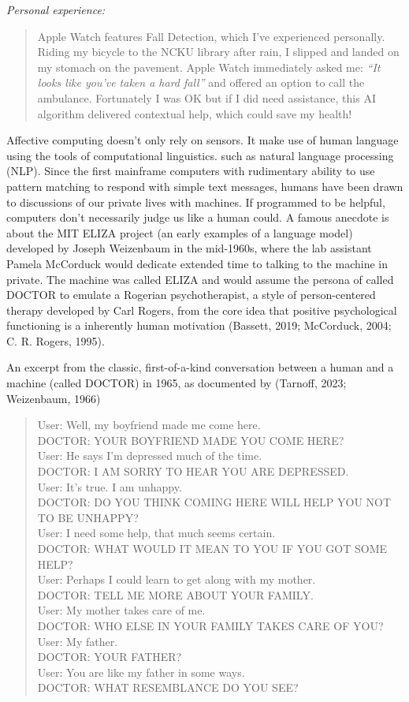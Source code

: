 \documentclass[
  12pt,
  letterpaper,
  DIV=11,
  numbers=noendperiod]{scrartcl}
\begin{document}
\emph{Personal experience:}

\begin{quote}
Apple Watch features Fall Detection, which I've experienced personally.
Riding my bicycle to the NCKU library after rain, I slipped and landed
on my stomach on the pavement. Apple Watch immediately asked me:
\emph{``It looks like you've taken a hard fall''} and offered an option
to call the ambulance. Fortunately I was OK but if I did need
assistance, this AI algorithm delivered contextual help, which could
save my health!
\end{quote}

Affective computing doesn't only rely on sensors. It make use of human
language using the tools of computational linguistics. such as natural
language processing (NLP). Since the first mainframe computers with
rudimentary ability to use pattern matching to respond with simple text
messages, humans have been drawn to discussions of our private lives
with machines. If programmed to be helpful, computers don't necessarily
judge us like a human could. A famous anecdote is about the MIT ELIZA
project (an early examples of a language model) developed by Joseph
Weizenbaum in the mid-1960s, where the lab assistant Pamela McCorduck
would dedicate extended time to talking to the machine in private. The
machine was called ELIZA and would assume the persona of called DOCTOR
to emulate a Rogerian psychotherapist, a style of person-centered
therapy developed by Carl Rogers, from the core idea that positive
psychological functioning is a inherently human motivation (Bassett,
2019; McCorduck, 2004; C. R. Rogers, 1995).

An excerpt from the classic, first-of-a-kind conversation between a
human and a machine (called DOCTOR) in 1965, as documented by (Tarnoff,
2023; Weizenbaum, 1966)

\begin{quote}
User: Well, my boyfriend made me come here.\\
DOCTOR: YOUR BOYFRIEND MADE YOU COME HERE?\\
User: He says I'm depressed much of the time.\\
DOCTOR: I AM SORRY TO HEAR YOU ARE DEPRESSED.\\
User: It's true. I am unhappy.\\
DOCTOR: DO YOU THINK COMING HERE WILL HELP YOU NOT TO BE UNHAPPY?\\
User: I need some help, that much seems certain.\\
DOCTOR: WHAT WOULD IT MEAN TO YOU IF YOU GOT SOME HELP?\\
User: Perhaps I could learn to get along with my mother.\\
DOCTOR: TELL ME MORE ABOUT YOUR FAMILY.\\
User: My mother takes care of me.\\
DOCTOR: WHO ELSE IN YOUR FAMILY TAKES CARE OF YOU?\\
User: My father.\\
DOCTOR: YOUR FATHER?\\
User: You are like my father in some ways.\\
DOCTOR: WHAT RESEMBLANCE DO YOU SEE?
\end{quote}
\end{document}

